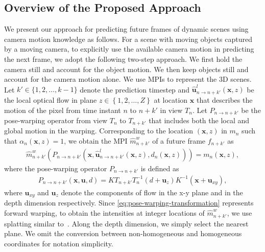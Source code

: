 \documentclass[preprint]{vgtc}
\begin{document}
    \subsection{Overview of the Proposed Approach}\label{subsec:overview}
    We present our approach for predicting future frames of dynamic scenes using camera motion knowledge as follows.
    For a scene with moving objects captured by a moving camera, to explicitly use the available camera motion in predicting the next frame, we adopt the following two-step approach.
    We first hold the camera still and account for the object motion.
    We then keep objects still and account for the camera motion alone.
    We use MPIs to represent the 3D scenes.
Let $k' \in \{1, 2, \ldots, k-1\}$ denote the prediction timestep and $\hat{\mathbf{u}}^{l}_{n \rightarrow n+k'}(\mathbf{x}, z)$ be the local optical flow in plane $z \in \left\{ 1, 2, \ldots, Z \right\}$ at location $\mathbf{x}$ that describes the motion of the pixel from time instant $n$ to $n+k'$ in view $T_n$.
    Let $P_{n \rightarrow n+k'}$ be the pose-warping operator from view $T_n$ to $T_{n+k'}$ that includes both the local and global motion in the warping.
    Corresponding to the location $(\mathbf{x}, z)$ in $m_n$ such that $\alpha_n(\mathbf{x}, z) = 1$, we obtain the MPI $\hat{m}^w_{n+k'}$ of a future frame $f_{n+k'}$ as
    \begin{align}
        \hat{m}^w_{n+k'}(P_{n \rightarrow n+k'}(\mathbf{x}, \hat{\mathbf{u}}^l_{n \rightarrow n+k'}(\mathbf{x}, z), d_n(\mathbf{x}, z))) = m_n(\mathbf{x}, z),
        \label{eq:total-motion-reconstruction}
    \end{align}
    where the pose-warping operator $P_{n \rightarrow n+k'}$ is defined as
    \begin{align}
        P_{n \rightarrow n+k'}(\mathbf{x}, \mathbf{u}, d) = K T_{n+k'} T_n^{-1} (d + \mathbf{u}_z) K^{-1} (\mathbf{x} + \mathbf{u}_{xy}),
        \label{eq:pose-warping-transformation}
    \end{align}
    where $\mathbf{u}_{xy}$ and $\mathbf{u}_z$ denote the components of flow in the x-y plane and in the depth dimension respectively.
Since \autoref{eq:pose-warping-transformation} represents forward warping, to obtain the intensities at integer locations of $\hat{m}^w_{n+k'}$, we use splatting similar to~\cite{tulsiani2018layer, kanchana2022ivp}.
    Along the depth dimension, we simply select the nearest plane.
    We omit the conversion between non-homogeneous and homogeneous coordinates for notation simplicity.
\end{document}
